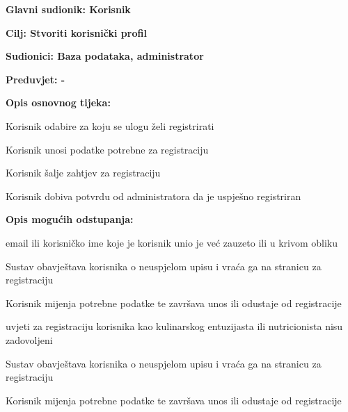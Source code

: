 					\noindent {}
					\begin{packed_item}
	
						\item \textbf{Glavni sudionik: Korisnik}
						\item  \textbf{Cilj: Stvoriti korisnički profil}
						\item  \textbf{Sudionici: Baza podataka, administrator}
						\item  \textbf{Preduvjet: - } 
						\item  \textbf{Opis osnovnog tijeka:}
						
						\item[] \begin{packed_enum}
	
							\item Korisnik odabire za koju se ulogu želi registrirati
							\item Korisnik unosi podatke potrebne za registraciju
							\item Korisnik šalje zahtjev za registraciju
							\item Korisnik dobiva potvrdu od administratora da je uspješno registriran
						\end{packed_enum}
						
						\item  \textbf{Opis mogućih odstupanja:}
						
						\item[] \begin{packed_item}
	
							\item[2.a] email ili korisničko ime koje je korisnik unio je već zauzeto ili u krivom obliku
							\item[] \begin{packed_enum}
								
								\item Sustav obavještava korisnika o neuspjelom upisu i vraća ga na stranicu za registraciju
								\item Korisnik mijenja potrebne podatke te završava unos ili odustaje od
registracije		
							\end{packed_enum}
							
							\item[3.a] uvjeti za registraciju korisnika kao kulinarskog entuzijasta ili nutricionista nisu zadovoljeni
							\item[] \begin{packed_enum}
								
								\item Sustav obavještava korisnika o neuspjelom upisu i vraća ga na stranicu za registraciju
								\item Korisnik mijenja potrebne podatke te završava unos ili odustaje od registracije		
							\end{packed_enum}	
						\end{packed_item}
					\end{packed_item}
					
